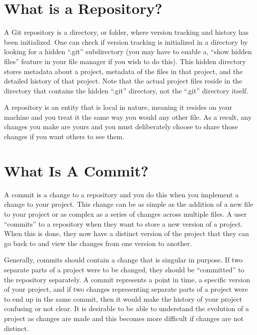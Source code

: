 \documentclass[
]{book}
\begin{document}
\hypertarget{what-is-a-repository}{%
\section{What is a Repository?}\label{what-is-a-repository}}

A Git repository is a directory, or folder, where version tracking and history has been initialized. One can check if version tracking is initialized in a directory by looking for a hidden ``.git'' subdirectory (you may have to enable a, ``show hidden files'' feature in your file manager if you wish to do this). This hidden directory stores metadata about a project, metadata of the files in that project, and the detailed history of that project. Note that the actual project files reside in the directory that contains the hidden ``.git'' directory, not the ``.git'' directory itself.

A repository is an entity that is local in nature, meaning it resides on your machine and you treat it the same way you would any other file. As a result, any changes you make are yours and you must deliberately choose to share those changes if you want others to see them.

\hypertarget{what-is-a-commit}{%
\section{What Is A Commit?}\label{what-is-a-commit}}

A commit is a change to a repository and you do this when you implement a change to your project. This change can be as simple as the addition of a new file to your project or as complex as a series of changes across multiple files. A user ``commits'' to a repository when they want to store a new version of a project. When this is done, they now have a distinct version of the project that they can go back to and view the changes from one version to another.

Generally, commits should contain a change that is singular in purpose. If two separate parts of a project were to be changed, they should be ``committed'' to the repository separately. A commit represents a point in time, a specific version of your project, and if two changes representing separate parts of a project were to end up in the same commit, then it would make the history of your project confusing or not clear. It is desirable to be able to understand the evolution of a project as changes are made and this becomes more difficult if changes are not distinct.
\end{document}
